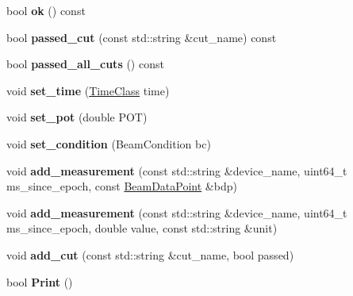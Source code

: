 \begin{DoxyCompactItemize}
\item 
\hypertarget{classBeamStatus_aba458d6774b27d401b393de038668849}{
bool {\bfseries ok} () const }
\label{classBeamStatus_aba458d6774b27d401b393de038668849}

\item 
\hypertarget{classBeamStatus_ab6b42b298203d0df45cfb46686d491c2}{
bool {\bfseries passed\_\-cut} (const std::string \&cut\_\-name) const }
\label{classBeamStatus_ab6b42b298203d0df45cfb46686d491c2}

\item 
\hypertarget{classBeamStatus_a34ae2eee9aeb8bfe54d176455e6caaa4}{
bool {\bfseries passed\_\-all\_\-cuts} () const }
\label{classBeamStatus_a34ae2eee9aeb8bfe54d176455e6caaa4}

\item 
\hypertarget{classBeamStatus_aa92b44fce12d6ed0a9a14adcdb95487a}{
void {\bfseries set\_\-time} (\hyperlink{classTimeClass}{TimeClass} time)}
\label{classBeamStatus_aa92b44fce12d6ed0a9a14adcdb95487a}

\item 
\hypertarget{classBeamStatus_a298a8def6b655bf601a73cd0f27ec5b1}{
void {\bfseries set\_\-pot} (double POT)}
\label{classBeamStatus_a298a8def6b655bf601a73cd0f27ec5b1}

\item 
\hypertarget{classBeamStatus_aff21cffb9bcc0562b0940839f80b30f4}{
void {\bfseries set\_\-condition} (BeamCondition bc)}
\label{classBeamStatus_aff21cffb9bcc0562b0940839f80b30f4}

\item 
\hypertarget{classBeamStatus_a088f4dc4e0db476f939314e6c596ee1c}{
void {\bfseries add\_\-measurement} (const std::string \&device\_\-name, uint64\_\-t ms\_\-since\_\-epoch, const \hyperlink{structBeamDataPoint}{BeamDataPoint} \&bdp)}
\label{classBeamStatus_a088f4dc4e0db476f939314e6c596ee1c}

\item 
\hypertarget{classBeamStatus_a5ea13f02f3addd9c9cfc406d461db5db}{
void {\bfseries add\_\-measurement} (const std::string \&device\_\-name, uint64\_\-t ms\_\-since\_\-epoch, double value, const std::string \&unit)}
\label{classBeamStatus_a5ea13f02f3addd9c9cfc406d461db5db}

\item 
\hypertarget{classBeamStatus_add23dfa0ed263857cd9f734815051b9a}{
void {\bfseries add\_\-cut} (const std::string \&cut\_\-name, bool passed)}
\label{classBeamStatus_add23dfa0ed263857cd9f734815051b9a}

\item 
\hypertarget{classBeamStatus_a9c074d793c6a5e55d12265895c736d9e}{
bool {\bfseries Print} ()}
\label{classBeamStatus_a9c074d793c6a5e55d12265895c736d9e}

\end{DoxyCompactItemize}
